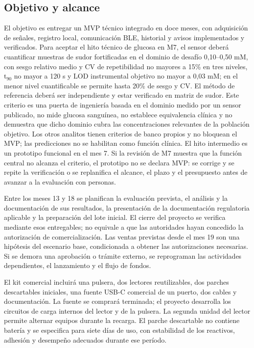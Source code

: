 \subsection{Objetivo y alcance}
El objetivo es entregar un MVP técnico integrado en doce meses, con adquisición de señales, registro local, comunicación BLE, historial y avisos implementados y verificados. Para aceptar el hito técnico de glucosa en M7, el sensor deberá cuantificar muestras de sudor fortificadas en el dominio de desafío 0,10--0,50 mM, con sesgo relativo medio y CV de repetibilidad no mayores a 15\% en tres niveles, t$_{90}$ no mayor a 120 s y LOD instrumental objetivo no mayor a 0,03 mM; en el menor nivel cuantificable se permite hasta 20\% de sesgo y CV. El método de referencia deberá ser independiente y estar verificado en matriz de sudor. Este criterio es una puerta de ingeniería basada en el dominio medido por un sensor publicado, no mide glucosa sanguínea, no establece equivalencia clínica y no demuestra que dicho dominio cubra las concentraciones relevantes de la población objetivo. Los otros analitos tienen criterios de banco propios y no bloquean el MVP; las predicciones no se habilitan como función clínica. El hito intermedio es un prototipo funcional en el mes 7. Si la revisión de M7 muestra que la función central no alcanza el criterio, el prototipo no se declara MVP: se corrige y se repite la verificación o se replanifica el alcance, el plazo y el presupuesto antes de avanzar a la evaluación con personas.

Entre los meses 13 y 18 se planifican la evaluación prevista, el análisis y la documentación de sus resultados, la presentación de la documentación regulatoria aplicable y la preparación del lote inicial. El cierre del proyecto se verifica mediante esos entregables; no equivale a que las autoridades hayan concedido la autorización de comercialización. Las ventas previstas desde el mes 19 son una hipótesis del escenario base, condicionada a obtener las autorizaciones necesarias. Si se demora una aprobación o trámite externo, se reprograman las actividades dependientes, el lanzamiento y el flujo de fondos.

El kit comercial incluirá una pulsera, dos lectores reutilizables, dos parches descartables iniciales, una fuente USB-C comercial de un puerto, dos cables y documentación. La fuente se comprará terminada; el proyecto desarrolla los circuitos de carga internos del lector y de la pulsera. La segunda unidad del lector permite alternar equipos durante la recarga. El parche descartable no contiene batería y se especifica para siete días de uso, con estabilidad de los reactivos, adhesión y desempeño adecuados durante ese período.

